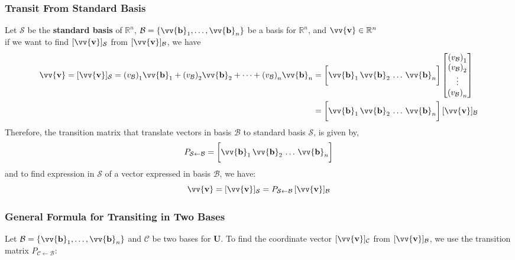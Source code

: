 \documentclass[11pt]{article}
\DeclareRobustCommand{\myvec}[1]{\vv{\mathbf{#1}}}
\newcommand{\mysubvecsp}[1]{\bm{{#1}}}
\newcommand{\myset}[1]{\mathcal{#1}}
\newcommand{\mymat}[1]{#1}
\begin{document}
    \subsubsection{Transit From Standard Basis}
    Let $\myset{S}$ be the \textbf{standard basis} of $\mathbb{R}^n$, $\myset{B} = \{\myvec{b}_1, \dots, \myvec{b}_n\}$ be a basis for $\mathbb{R}^n$, and $\myvec{v} \in \mathbb{R}^n$\\
    if we want to find $[\myvec{v}]_\myset{S}$ from $[\myvec{v}]_\myset{B}$, we have
    \begin{align*}
    \myvec{v} = [\myvec{v}]_{\myset{S}} = {(v_\myset{B})}_1\myvec{b}_1 + {(v_\myset{B})}_2\myvec{b}_2 + \dots + {(v_\myset{B})}_n\myvec{b}_n 
        & = \bigg[ \myvec{b}_1 \, \myvec{b}_2 \, \dots \, \myvec{b}_n \bigg] 
        \begin{bmatrix} {(v_\myset{B})}_1 \\ {(v_\myset{B})}_2 \\ \vdots \\ {(v_\myset{B})}_n \end{bmatrix} \\
        & = \bigg[ \myvec{b}_1 \, \myvec{b}_2 \, \dots \, \myvec{b}_n \bigg]\,[\myvec{v}]_\myset{B}
    \end{align*}
    Therefore, the transition matrix that translate vectors in basis $\myset{B}$ to standard basis $\myset{S}$, is given by,
    \begin{equation}
        \mymat{P}_{\myset{S}\leftarrow\myset{B}} = \bigg[ \myvec{b}_1 \, \myvec{b}_2 \, \dots \, \myvec{b}_n \bigg]
    \end{equation} 
    and to find expression in $\myset{S}$ of a vector expressed in basis $\myset{B}$, we have:
    \begin{equation}
        \myvec{v} = [\myvec{v}]_{\myset{S}} = \mymat{P}_{\myset{S}\leftarrow\myset{B}} \, [\myvec{v}]_{\myset{B}}
    \end{equation}
        
    \subsubsection{General Formula for Transiting in Two Bases}

    Let $\myset{B} = \{\myvec{b}_1, \dots, \myvec{b}_n\}$ and $\myset{C}$ be two bases for $\mysubvecsp{U}$.
    To find the coordinate vector $[\myvec{v}]_{\myset{C}}$ from $[\myvec{v}]_{\myset{B}}$, we use the transition matrix $\mymat{P}_{\myset{C} \leftarrow \myset{B}}$:
\end{document}
